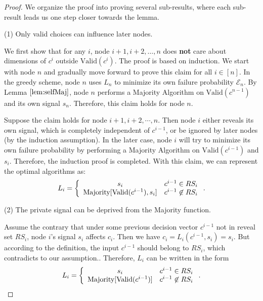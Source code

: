 \documentclass[a4paper,UKenglish]{lipics}
\theoremstyle{definition}
\begin{document}
\begin{proof}
We organize the proof into proving several sub-results,
	where each sub-result leads us one  step closer towards the lemma.

(1) Only valid choices can influence later nodes.

We first show that for any $i$, node $i+1, i+2, \dots, n$ does \textbf{not} care about dimensions of $c^{i}$ outside $\text{Valid}(c^{i})$.
The proof is based on induction. 
We start with node $n$ and gradually move forward to prove this claim for all $i\in [n]$.
In the greedy scheme, node $n$ uses $L_n$ to minimize its own failure probability $\mathcal{E}_n$.
By Lemma $\ref{lem:selfMaj}$, node $n$ performs a Majority Algorithm on $\text{Valid}(c^{n-1})$ and its own signal $s_n$. 
Therefore, this claim holds for node $n$.

Suppose the claim holds for node $i+1, i+2,\dotsb, n$.
Then node $i$ either reveals its own signal, which is completely independent of $c^{i-1}$, or be ignored by later nodes (by the induction assumption). 
In the later case, node $i$ will try to minimize its own failure probability by performing a Majority Algorithm on $\text{Valid}(c^{i-1})$ and $s_i$.
Therefore, the induction proof is completed.
With this claim, we can represent the optimal algorithms as:
\begin{equation*}
L_i 
= \left\{ 
	\begin{array}{c l}
		s_i & c^{i-1} \in RS_i \\
 		\text{Majority}[\text{Valid}(c^{i-1}), s_i] & c^{i-1} \not\in RS_i
 	\end{array}
	\right..
\end{equation*}

(2) The private signal can be deprived from the Majority function.

Assume the contrary that under some previous decision vector $c^{i-1}$ not in reveal set $RS_i$, node $i$'s signal $s_i$ affects $c_i$. 
Then we have $c_i = L_i(c^{i-1},s_i) = s_i$.
But according to the definition, the input $c^{i-1}$ should belong to $RS_i$, which contradicts to our assumption..
Therefore, $L_i$ can be written in the form
\begin{equation*}
L_i 
= \left\{ 
	\begin{array}{c l}
		s_i & c^{i-1} \in RS_i \\
 		\text{Majority}[\text{Valid}(c^{i-1})] & c^{i-1} \not\in RS_i
 	\end{array}
	\right..
\end{equation*}


\end{proof}
\end{document}
